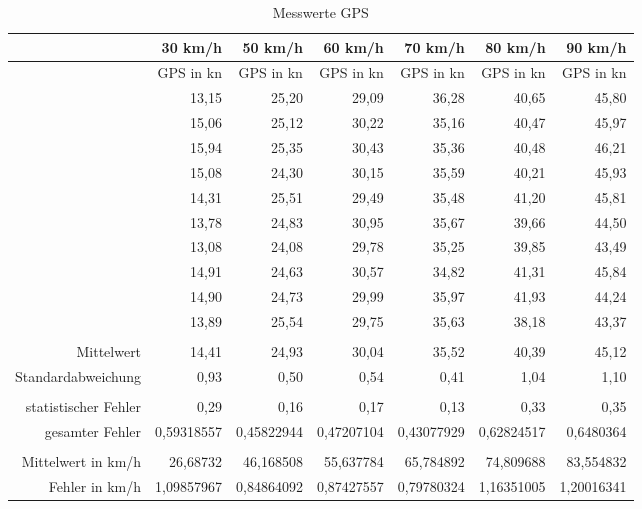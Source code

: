 \begin{table}[htbp]
  \centering
  \caption{Messwerte GPS}
    \begin{tabular}{rrrrrrr}
    \toprule
          & 30 km/h & 50 km/h & 60 km/h & 70 km/h & 80 km/h & 90 km/h \\
    \midrule
          & GPS in kn & GPS in kn & GPS in kn & GPS in kn & GPS in kn & GPS in kn \\
          & 13,15 & 25,20  & 29,09 & 36,28 & 40,65 & 45,80 \\
          & 15,06 & 25,12 & 30,22 & 35,16 & 40,47 & 45,97 \\
          & 15,94 & 25,35 & 30,43 & 35,36 & 40,48 & 46,21 \\
          & 15,08 & 24,30  & 30,15 & 35,59 & 40,21 & 45,93 \\
          & 14,31 & 25,51 & 29,49 & 35,48 & 41,20  & 45,81 \\
          & 13,78 & 24,83 & 30,95 & 35,67 & 39,66 & 44,50 \\
          & 13,08 & 24,08 & 29,78 & 35,25 & 39,85 & 43,49 \\
          & 14,91 & 24,63 & 30,57 & 34,82 & 41,31 & 45,84 \\
          & 14,90  & 24,73 & 29,99 & 35,97 & 41,93 & 44,24 \\
          & 13,89 & 25,54 & 29,75 & 35,63 & 38,18 & 43,37 \\
          &       &       &       &       &       &  \\
    Mittelwert & 14,41 & 24,93 & 30,04 & 35,52 & 40,39 & 45,12 \\
    Standardabweichung & 0,93 & 0,50 & 0,54 & 0,41 & 1,04 & 1,10 \\
          &       &       &       &       &       &  \\
    statistischer Fehler & 0,29 & 0,16 & 0,17 & 0,13 & 0,33 & 0,35 \\
    gesamter Fehler & 0,59318557 & 0,45822944 & 0,47207104 & 0,43077929 & 0,62824517 & 0,6480364 \\
          &       &       &       &       &       &  \\
    Mittelwert in km/h & 26,68732 & 46,168508 & 55,637784 & 65,784892 & 74,809688 & 83,554832 \\
    Fehler in km/h & 1,09857967 & 0,84864092 & 0,87427557 & 0,79780324 & 1,16351005 & 1,20016341 \\
    \bottomrule
    \end{tabular}%
  \label{tab:GPS}%
\end{table}%

